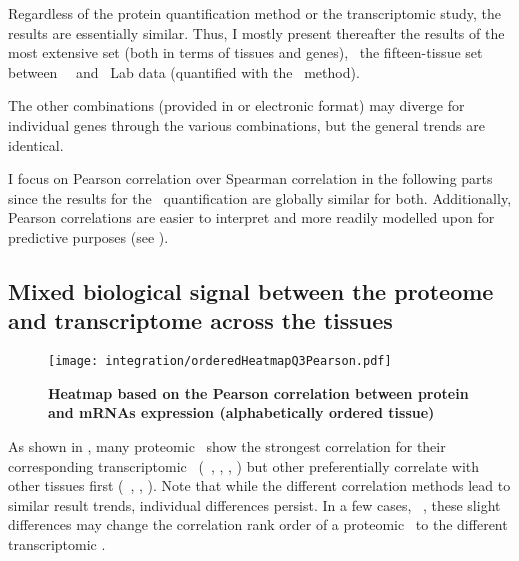 Regardless of the protein quantification method or
the transcriptomic study, %
the results are essentially similar.
Thus, I mostly present thereafter the results of the most extensive set
(both in terms of tissues and genes),
\ie\ the fifteen-tissue set between \uhlen\ \etal\ and \pandey\ Lab data
(quantified with the \PPKM\ method).\mybr\

\vspace{-1mm}
The other combinations
(provided in  or electronic format)
may diverge for individual genes through the various combinations,
but the general trends are identical.
\vspace{-1mm}

I focus on Pearson correlation over Spearman correlation
in the following parts
since the results for the \PPKM\ quantification are globally similar for both.
Additionally, Pearson correlations are easier to interpret
and more readily modelled upon for predictive purposes
(see ).\mybr\
\vspace{-1.5mm}

\subsection{Mixed biological signal between the proteome and transcriptome
across the tissues}
\vspace{-8mm}
\begin{figure}[!hb]
    \texttt{[image: integration/orderedHeatmapQ3Pearson.pdf]}\centering
    \vspace{-3.5mm}
    \caption[Heatmap based on the Pearson correlation between protein and mRNAs
    expression (alphabetically ordered tissue)]{\label{fig:orderedHeatmapPearson}%
    \textbf{Heatmap based on the Pearson correlation between protein and mRNAs
    expression (alphabetically ordered tissue)}}
\end{figure}

As shown in ,
many proteomic \treps\ show the strongest correlation for
their corresponding transcriptomic \trep\
(\eg\ \liver, \testis, \ovary, \pancreas)
but other preferentially correlate with other tissues first
(\eg\ \tissue{Urinarybladder}, \Oesophagus, \gallbladder).
Note that while the different correlation methods lead to similar result trends,
individual differences persist.
In a few cases, \eg\ \heart,
these slight differences may change the correlation rank order of
a proteomic \treps\ to the different transcriptomic \treps{}.


